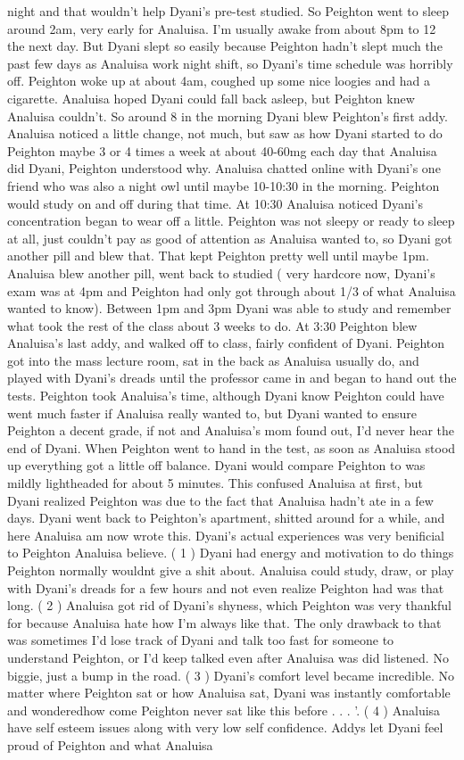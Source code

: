 \documentclass[12pt]{book}
\begin{document}
night and that wouldn't help Dyani's pre-test studied. So Peighton went to sleep around 2am, very early for Analuisa. I'm usually awake from about 8pm to 12 the next day. But Dyani slept so easily because Peighton hadn't slept much the past few days as Analuisa work night shift, so Dyani's time schedule was horribly off. Peighton woke up at about 4am, coughed up some nice loogies and had a cigarette. Analuisa hoped Dyani could fall back asleep, but Peighton knew Analuisa couldn't. So around 8 in the morning Dyani blew Peighton's first addy. Analuisa noticed a little change, not much, but saw as how Dyani started to do Peighton maybe 3 or 4 times a week at about 40-60mg each day that Analuisa did Dyani, Peighton understood why. Analuisa chatted online with Dyani's one friend who was also a night owl until maybe 10-10:30 in the morning. Peighton would study on and off during that time. At 10:30 Analuisa noticed Dyani's concentration began to wear off a little. Peighton was not sleepy or ready to sleep at all, just couldn't pay as good of attention as Analuisa wanted to, so Dyani got another pill and blew that. That kept Peighton pretty well until maybe 1pm. Analuisa blew another pill, went back to studied ( very hardcore now, Dyani's exam was at 4pm and Peighton had only got through about 1/3 of what Analuisa wanted to know). Between 1pm and 3pm Dyani was able to study and remember what took the rest of the class about 3 weeks to do. At 3:30 Peighton blew Analuisa's last addy, and walked off to class, fairly confident of Dyani. Peighton got into the mass lecture room, sat in the back as Analuisa usually do, and played with Dyani's dreads until the professor came in and began to hand out the tests. Peighton took Analuisa's time, although Dyani know Peighton could have went much faster if Analuisa really wanted to, but Dyani wanted to ensure Peighton a decent grade, if not and Analuisa's mom found out, I'd never hear the end of Dyani. When Peighton went to hand in the test, as soon as Analuisa stood up everything got a little off balance. Dyani would compare Peighton to was mildly lightheaded for about 5 minutes. This confused Analuisa at first, but Dyani realized Peighton was due to the fact that Analuisa hadn't ate in a few days. Dyani went back to Peighton's apartment, shitted around for a while, and here Analuisa am now wrote this. Dyani's actual experiences was very benificial to Peighton Analuisa believe. ( 1 ) Dyani had energy and motivation to do things Peighton normally wouldnt give a shit about. Analuisa could study, draw, or play with Dyani's dreads for a few hours and not even realize Peighton had was that long. ( 2 ) Analuisa got rid of Dyani's shyness, which Peighton was very thankful for because Analuisa hate how I'm always like that. The only drawback to that was sometimes I'd lose track of Dyani and talk too fast for someone to understand Peighton, or I'd keep talked even after Analuisa was did listened. No biggie, just a bump in the road. ( 3 ) Dyani's comfort level became incredible. No matter where Peighton sat or how Analuisa sat, Dyani was instantly comfortable and wonderedhow come Peighton never sat like this before . . .  '. ( 4 ) Analuisa have self esteem issues along with very low self confidence. Addys let Dyani feel proud of Peighton and what Analuisa 
\end{document}
